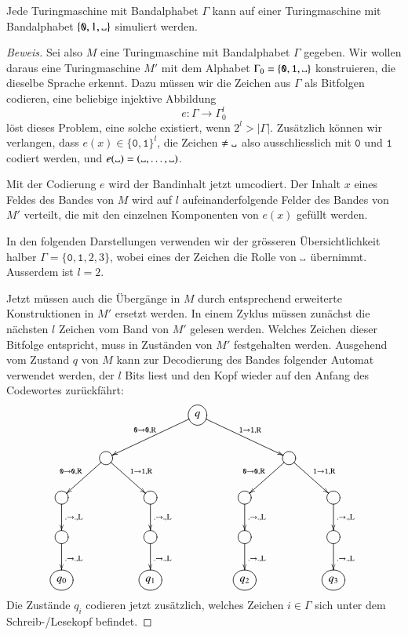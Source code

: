 \begin{satz}
Jede Turingmaschine mit Bandalphabet $\Gamma$ kann auf einer Turingmaschine
mit Bandalphabet $\{\texttt{0},1,\blank\}$ simuliert werden.
\end{satz}

\begin{proof}[Beweis]
Sei also $M$ eine Turingmaschine mit Bandalphabet $\Gamma$ gegeben. Wir
wollen daraus eine Turingmaschine $M'$ mit dem Alphabet
$\Gamma_0= \{\texttt{0},\texttt{1},\blank\}$ konstruieren, die dieselbe
Sprache erkennt. Dazu müssen wir die Zeichen aus $\Gamma$ als
Bitfolgen codieren, eine beliebige injektive Abbildung
\[
e\colon\Gamma\to \Gamma_0^l
\]
löst dieses Problem, eine solche existiert, wenn $2^l>|\Gamma|$.
Zusätzlich können
wir verlangen, dass $e(x)\in \{\texttt{0},\texttt{1}\}^l$, die Zeichen $\ne\blank$
also ausschliesslich mit $\texttt{0}$ und $\texttt{1}$ codiert werden, und
$e(\blank)=(\blank,\dots,\blank)$.

Mit der Codierung $e$ wird der Bandinhalt jetzt umcodiert. Der Inhalt
$x$
eines Feldes des Bandes von $M$ wird auf $l$ aufeinanderfolgende Felder
des Bandes von $M'$ verteilt, die mit den einzelnen Komponenten
von $e(x)$ gefüllt werden.

In den folgenden Darstellungen verwenden wir der grösseren
Übersichtlichkeit halber $\Gamma=\{\texttt{0},\texttt{1},2,3\}$, wobei eines der
Zeichen die Rolle von $\blank$ übernimmt. Ausserdem ist $l=2$.

Jetzt müssen auch die Übergänge in $M$
durch entsprechend erweiterte Konstruktionen in $M'$ ersetzt werden.
In einem Zyklus müssen zunächst die nächsten $l$ Zeichen vom Band
von $M'$ gelesen werden. Welches Zeichen dieser Bitfolge entspricht,
muss in Zuständen von $M'$ festgehalten werden. Ausgehend vom Zustand
$q$ von $M$ kann zur Decodierung
des Bandes folgender Automat verwendet werden, der $l$ Bits liest
und den Kopf wieder auf den Anfang des Codewortes zurückfährt:
\[
\entrymodifiers={++[o][F]}
\xymatrix{
*+\txt{}
	&*+\txt{}
		&*+\txt{}
			&q\ar[dll]_{\texttt{0}\to \texttt{0},\text{R}} \ar[drr]^{\texttt{1}\to \texttt{1},\text{R}}
\\
*+\txt{}
	&\ar[dl]_{\texttt{0}\to \texttt{0},\text{R}} \ar[dr]^{\texttt{1}\to \texttt{1},\text{R}}
		&*+\txt{}
			&*+\txt{}
				&*+\txt{}
					&\ar[dl]_{\texttt{0}\to \texttt{0},\text{R}} \ar[dr]^{\texttt{1}\to \texttt{1},\text{R}}
						&*+\txt{}
\\
\ar[d]^{.\to .,\text{L}}
	&*+\txt{}
		&\ar[d]^{.\to .,\text{L}}
			&*+\txt{}
				&\ar[d]^{.\to .,\text{L}}
					&*+\txt{}
						&\ar[d]^{.\to .,\text{L}}
\\
\ar[d]^{.\to .,\text{L}}
	&*+\txt{}
		&\ar[d]^{.\to .,\text{L}}
			&*+\txt{}
				&\ar[d]^{.\to .,\text{L}}
					&*+\txt{}
						&\ar[d]^{.\to .,\text{L}}
\\
q_0
	&*+\txt{}
		&q_1
			&*+\txt{}
				&q_2
					&*+\txt{}
						&q_3
}
\]
Die Zustände $q_i$ codieren jetzt zusätzlich, welches
Zeichen $i\in\Gamma$ sich unter dem Schreib-/Lesekopf befindet.


\end{proof}
